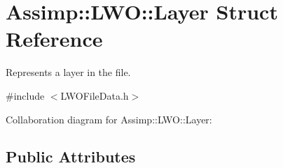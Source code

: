\hypertarget{struct_assimp_1_1_l_w_o_1_1_layer}{\section{Assimp\+:\+:L\+W\+O\+:\+:Layer Struct Reference}
\label{struct_assimp_1_1_l_w_o_1_1_layer}
}


Represents a layer in the file.  




{\ttfamily \#include $<$L\+W\+O\+File\+Data.\+h$>$}



Collaboration diagram for Assimp\+:\+:L\+W\+O\+:\+:Layer\+:
\subsection*{Public Attributes}
